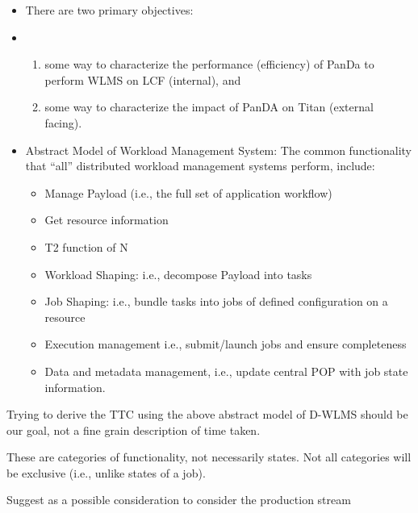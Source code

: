 
%
%

\begin{itemize}
    \item There are two primary objectives:
    \item %
        \begin{enumerate}
            \item some way to characterize the performance (efficiency) of
                PanDa to perform WLMS on LCF (internal), and
            \item some way to characterize the impact of PanDA on Titan
                (external facing).
        \end{enumerate}
    \item Abstract Model of Workload Management System: The common
        functionality that ``all'' distributed workload management systems
        perform, include:
        \begin{itemize}
            \item Manage Payload (i.e., the full set of application workflow)
            \item Get resource information
            \item T2 function of N
            \item Workload Shaping: i.e., decompose Payload into tasks
            \item Job Shaping: i.e., bundle tasks into jobs of defined
                configuration on a resource
            \item Execution management i.e., submit/launch jobs and ensure
                completeness
            \item Data and metadata management, i.e., update central POP with
                job state information.
        \end{itemize}
\end{itemize}

Trying to derive the TTC using the above abstract model of D-WLMS should be our
goal, not a fine grain description of time taken.

These are categories of functionality, not necessarily states. Not all
categories will be exclusive (i.e., unlike states of a job). 

Suggest as a possible consideration to consider the production stream

